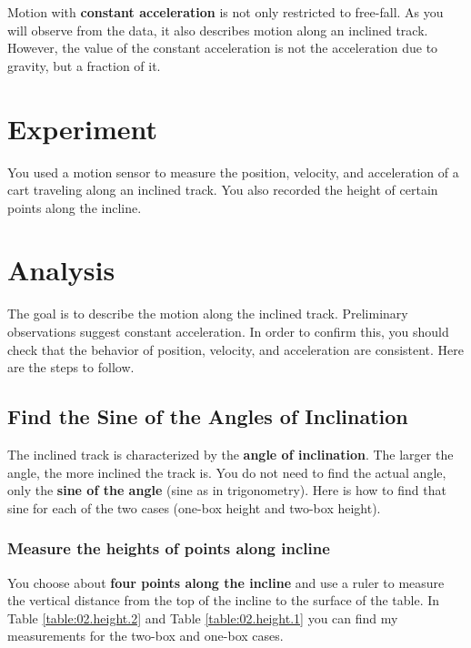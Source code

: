 Motion with \textbf{constant acceleration} is not only restricted to free-fall. As you will observe from the data, it also describes motion along an inclined track. However, the value of the constant acceleration is not the acceleration due to gravity, but a fraction of it.
\section{Experiment}
You used a motion sensor to measure the position, velocity, and acceleration of a cart traveling along an inclined track. You also recorded the height of certain points along the incline.
\section{Analysis}
The goal is to describe the motion along the inclined track. Preliminary observations suggest constant acceleration. In order to confirm this, you should check that the behavior of position, velocity, and acceleration are consistent. Here are the steps to follow.
\subsection{Find the Sine of the Angles of Inclination}
The inclined track is characterized by the \textbf{angle of inclination}. The larger the angle, the more inclined the track is. You do not need to find the actual angle, only the \textbf{sine of the angle} (sine as in trigonometry). Here is how to find that sine for each of the two cases (one-box height and two-box height).
\subsubsection{Measure the heights of points along incline}
You choose about \textbf{four points along the incline} and use a ruler to measure the vertical distance from the top of the incline to the surface of the table. In Table \ref{table:02.height.2} and Table \ref{table:02.height.1} you can find my measurements for the two-box and one-box cases.
